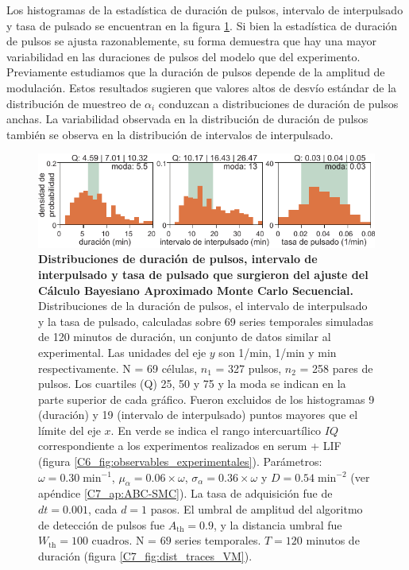 \documentclass[./main.tex]{subfiles}
\begin{document}
Los histogramas de la estadística de duración de pulsos, intervalo de interpulsado y tasa de pulsado se encuentran en la figura \ref{C7_fig:dist_param_evaluation_hist}. Si bien la estadística de duración de pulsos se ajusta razonablemente, su forma demuestra que hay una mayor variabilidad en las duraciones de pulsos del modelo que del experimento. Previamente estudiamos que la duración de pulsos depende de la amplitud de modulación. Estos resultados sugieren que valores altos de desvío estándar de la distribución de muestreo de $\alpha_i$ conduzcan a distribuciones de duración de pulsos anchas.  La variabilidad observada en la distribución de duración de pulsos también se observa en la distribución de intervalos de interpulsado.


\begin{figure}
    \centering
    \includegraphics[width=1\columnwidth]{figures/chapter7/C7_dist_validation_hist.pdf} 
    \caption{\textbf{Distribuciones de duración de pulsos, intervalo de interpulsado y tasa de pulsado que surgieron del ajuste del Cálculo Bayesiano Aproximado Monte Carlo Secuencial.} Distribuciones de la duración de pulsos, el intervalo de interpulsado y la tasa de pulsado, calculadas sobre 69 series temporales simuladas de 120 minutos de duración, un conjunto de datos similar al experimental. Las unidades del eje $y$ son 1/min, 1/min y min respectivamente. N = 69 células, $n_1$ = 327 pulsos, $n_2$ = 258 pares de pulsos. Los cuartiles (Q) 25, 50 y 75 y la moda se indican en la parte superior de cada gráfico. Fueron excluidos de los histogramas 9 (duración) y 19 (intervalo de interpulsado) puntos mayores que el límite del eje $x$. En verde se indica el rango intercuartílico $IQ$ correspondiente a los experimentos realizados en serum + LIF (figura \ref{C6_fig:observables_experimentales}). Parámetros:  $\omega = 0.30 \; \text{min}^{-1}$, $\mu_{\alpha} = 0.06 \times \omega$, $ \sigma_{\alpha} = 0.36  \times \omega$ y $D = 0.54 \; \text{min}^{-2}$ (ver apéndice \ref{C7_ap:ABC-SMC}). La tasa de adquisición fue de $dt = 0.001$, cada $d = 1$ pasos. El umbral de amplitud del algoritmo de detección de pulsos fue $A_{\text{th}} = 0.9$, y la distancia umbral fue $W_{\text{th}} = 100\text{ cuadros}$. N = $69$ series temporales. $T = 120$ minutos de duración (figura \ref{C7_fig:dist_traces_VM}).}
    \label{C7_fig:dist_param_evaluation_hist}
\end{figure} 
\end{document}
